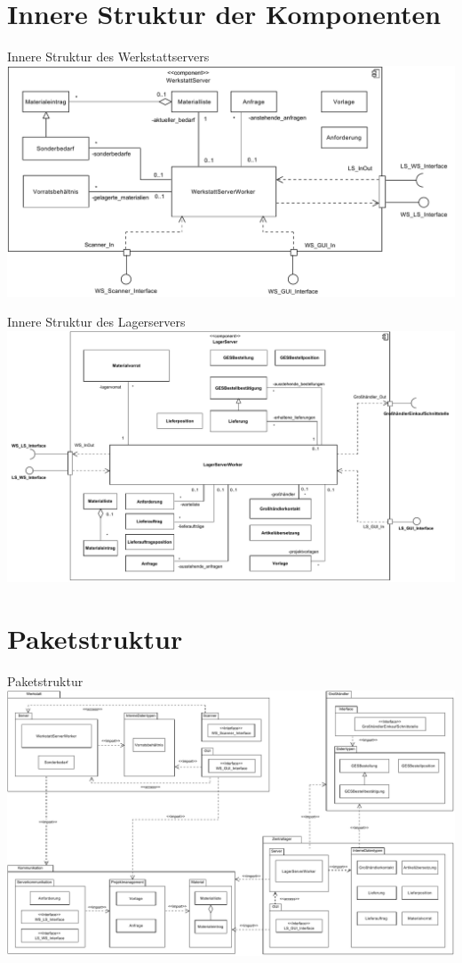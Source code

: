 \documentclass{beamer}
\begin{document}
	\section{Innere Struktur der Komponenten}
	\begin{frame}{Innere Struktur des Werkstattservers}
		\includegraphics[width=\textwidth]{PDF/WS_Innere_Struktur.pdf}
	\end{frame}
	\begin{frame}{Innere Struktur des Lagerservers}
		\includegraphics[width=\textwidth]{PDF/LS_Innere_Struktur.pdf}
	\end{frame}
	\section{Paketstruktur}
	\begin{frame}{Paketstruktur}
		\includegraphics[height=0.75 \textheight]{PDF/Paket_Struktur.pdf}
	\end{frame}
\end{document}
